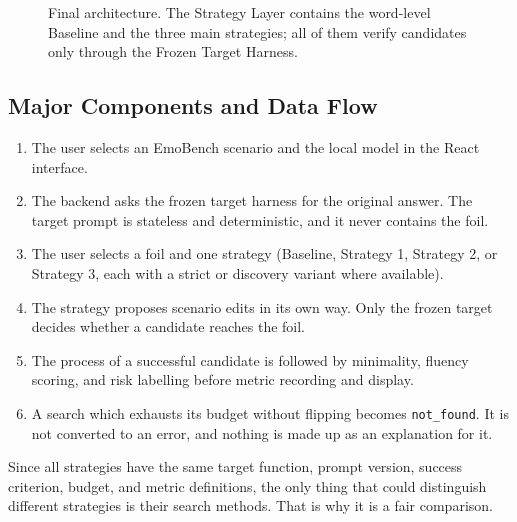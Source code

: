\documentclass[11pt,a4paper]{article}
\begin{document}
\begin{figure}[htbp]
{%
}
\caption{Final architecture. The Strategy Layer contains the word-level Baseline and
the three main strategies; all of them verify candidates only through the Frozen
Target Harness.}
\label{fig:architecture}
\end{figure}

\subsection{Major Components and Data Flow}

\begin{enumerate}
  \item The user selects an EmoBench scenario and the local model in the React
  interface.
  \item The backend asks the frozen target harness for the original answer. The target
  prompt is stateless and deterministic, and it never contains the foil.
  \item The user selects a foil and one strategy (Baseline, Strategy 1, Strategy 2, or
  Strategy 3, each with a strict or discovery variant where available).
  \item The strategy proposes scenario edits in its own way. Only the frozen target
  decides whether a candidate reaches the foil.
  \item The process of a successful candidate is followed by minimality, fluency
  scoring, and risk labelling before metric recording and display.
  \item A search which exhausts its budget without flipping becomes
  \texttt{not\_found}. It is not converted to an error, and nothing is made up as an
  explanation for it.
\end{enumerate}

Since all strategies have the same target function, prompt version, success criterion,
budget, and metric definitions, the only thing that could distinguish different
strategies is their search methods. That is why it is a fair comparison.
\end{document}
